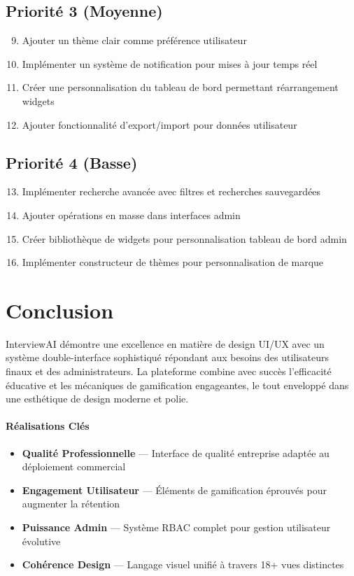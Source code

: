 \documentclass[12pt, a4paper]{report}
\begin{document}
\subsection{Priorité 3 (Moyenne)}
\begin{enumerate}
    \setcounter{enumi}{8}
    \item Ajouter un thème clair comme préférence utilisateur
    \item Implémenter un système de notification pour mises à jour temps réel
    \item Créer une personnalisation du tableau de bord permettant réarrangement widgets
    \item Ajouter fonctionnalité d'export/import pour données utilisateur
\end{enumerate}

\subsection{Priorité 4 (Basse)}
\begin{enumerate}
    \setcounter{enumi}{12}
    \item Implémenter recherche avancée avec filtres et recherches sauvegardées
    \item Ajouter opérations en masse dans interfaces admin
    \item Créer bibliothèque de widgets pour personnalisation tableau de bord admin
    \item Implémenter constructeur de thèmes pour personnalisation de marque
\end{enumerate}

\section{Conclusion}

InterviewAI démontre une excellence en matière de design UI/UX avec un système double-interface sophistiqué répondant aux besoins des utilisateurs finaux et des administrateurs. La plateforme combine avec succès l'efficacité éducative et les mécaniques de gamification engageantes, le tout enveloppé dans une esthétique de design moderne et polie.

\paragraph{Réalisations Clés}
\begin{itemize}
    \item \textbf{Qualité Professionnelle} --- Interface de qualité entreprise adaptée au déploiement commercial
    \item \textbf{Engagement Utilisateur} --- Éléments de gamification éprouvés pour augmenter la rétention
    \item \textbf{Puissance Admin} --- Système RBAC complet pour gestion utilisateur évolutive
    \item \textbf{Cohérence Design} --- Langage visuel unifié à travers 18+ vues distinctes
\end{itemize}
\end{document}
